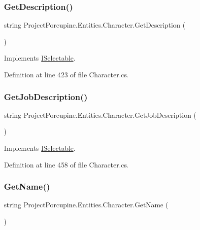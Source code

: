 \subsubsection{\texorpdfstring{Get\+Description()}{GetDescription()}}
{\footnotesize\ttfamily string Project\+Porcupine.\+Entities.\+Character.\+Get\+Description (\begin{DoxyParamCaption}{ }\end{DoxyParamCaption})}



Implements \hyperlink{interface_i_selectable_a1d8947a443b6214cff01f2d75c8bc75a}{I\+Selectable}.



Definition at line 423 of file Character.\+cs.

\mbox{\label{class_project_porcupine_1_1_entities_1_1_character_a8bdbe6c8bd400cb777f7c6e34f54c29b}} 
\subsubsection{\texorpdfstring{Get\+Job\+Description()}{GetJobDescription()}}
{\footnotesize\ttfamily string Project\+Porcupine.\+Entities.\+Character.\+Get\+Job\+Description (\begin{DoxyParamCaption}{ }\end{DoxyParamCaption})}



Implements \hyperlink{interface_i_selectable_a4d0f9fa51a3d70a7fbcbb39e126e4c73}{I\+Selectable}.



Definition at line 458 of file Character.\+cs.

\mbox{\label{class_project_porcupine_1_1_entities_1_1_character_abe834c84bb93ab0518c92452a33d18e5}} 
\subsubsection{\texorpdfstring{Get\+Name()}{GetName()}}
{\footnotesize\ttfamily string Project\+Porcupine.\+Entities.\+Character.\+Get\+Name (\begin{DoxyParamCaption}{ }\end{DoxyParamCaption})}



